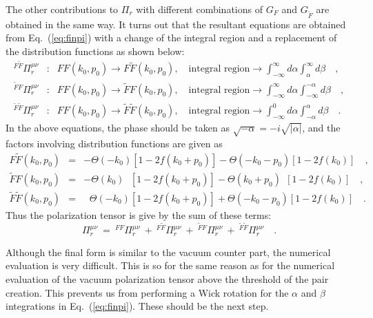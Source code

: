 The other contributions to $\Pi_{r}$ with different combinations of $G_{F}$
and
$G_{\tilde{F}}$ are obtained in the same way. It turns out that the
resultant
equations
are obtained from Eq.~(\ref{eq:finpi}) with a change of the integral region
and
a replacement of the distribution functions as shown below:
\begin{eqnarray}
^{F\tilde{F}}\Pi_{r}^{\mu\nu} &:& FF(k_{0}, p_{0}) \rightarrow
F\tilde{F}(k_{0}, p_{0}) , \quad \mbox{integral region}
\rightarrow \int_{-\infty}^{\infty}d\alpha \int^{\infty}_{\alpha}d\beta
\quad , \\
^{\tilde{F}F}\Pi_{r}^{\mu\nu} &:& FF(k_{0}, p_{0}) \rightarrow
\tilde{F}F(k_{0}, p_{0}) , \quad \mbox{integral region}
\rightarrow \int_{-\infty}^{\infty}d\alpha \int_{-\infty}^{-\alpha}d\beta
\quad , \\
^{\tilde{F}\tilde{F}}\Pi_{r}^{\mu\nu} &:& FF(k_{0}, p_{0}) \rightarrow
\tilde{F}\tilde{F}(k_{0}, p_{0}) , \quad \mbox{integral region}
\rightarrow \int_{-\infty}^{0}d\alpha \int^{\alpha}_{-\alpha}d\beta
\quad .
\label{eq:rep}
\end{eqnarray}
In the above equations, the phase should be taken as $\sqrt{-\alpha} = -i
\sqrt{|\alpha|}$, and the factors involving distribution functions are given
as
\begin{eqnarray}
F\tilde{F}(k_{0}, p_{0}) & = & -\Theta (-k_{0}) \left [1 - 2 f(k_{0} +
p_{0}) \right ]
- \Theta (-k_{0} - p_{0}) \left [1 - 2 f(k_{0}) \right ] \quad , \\
\tilde{F}F(k_{0}, p_{0}) & = & -\Theta (k_{0}) \ \ \,
\left [1 - 2 f(k_{0} + p_{0}) \right ]
- \Theta (k_{0} + p_{0}) \ \ \left [1 - 2 f(k_{0}) \right ] \quad , \\
\tilde{F}\tilde{F}(k_{0}, p_{0}) & = & \ \ \, \Theta (-k_{0})
\left [1 - 2 f(k_{0} + p_{0}) \right ]
+ \Theta (-k_{0} - p_{0}) \left [1 - 2 f(k_{0}) \right ] \quad .
\label{eq:defffs}
\end{eqnarray}
Thus the polarization tensor is give by the sum of these terms:
\begin{equation}
\Pi_{r}^{\mu\nu} \ = \ ^{FF}\Pi_{r}^{\mu\nu}
\ + \ ^{F\tilde{F}}\Pi_{r}^{\mu\nu} \ + \ ^{\tilde{F}F}\Pi_{r}^{\mu\nu}
\ + \ ^{\tilde{F}\tilde{F}}\Pi_{r}^{\mu\nu}  \quad .
\label{eq:pisum}
\end{equation}

Although the final form is similar to the vacuum counter part, the numerical
evaluation is very difficult. This is so for the same reason as for the
numerical
evaluation of the vacuum polarization tensor above the threshold of the pair
creation.
This prevents us from performing a Wick rotation for the $\alpha $ and
$\beta $ integrations in Eq.~(\ref{eq:finpi}). These should be the next
step.

